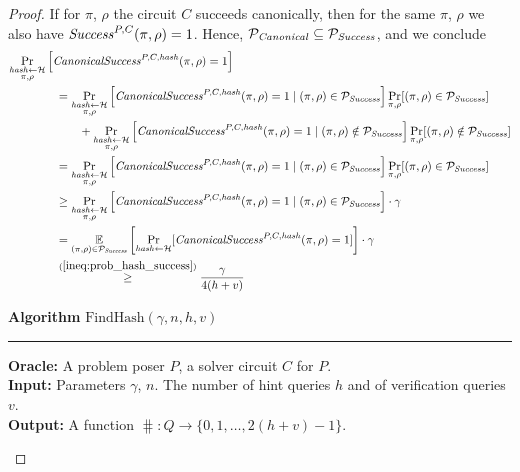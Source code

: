 \begin{proof}
If for $\pi$, $\rho$ the circuit $C$ succeeds canonically, then for the same $\pi$, $\rho$ we also have $\operatorname{\mathit{Success}}^{P, C}(\pi, \rho) = 1$.
Hence, $\mathcal{P}_{\mathit{Canonical}} \subseteq \mathcal{P}_{\mathit{Success}}$, and we conclude
\begin{align}
  \label{ineq:hash_high_prob}
&\underset{\substack{\hash \leftarrow \cH \\ \pi, \rho}}{\Pr}\left[\CanonicalSuccess^{P, C, \hash}(\pi, \rho) = 1\right] \notag\\
&\IndII = \underset{\substack{\hash \leftarrow \cH \\ \pi, \rho}}{\Pr}\left[\CanonicalSuccess^{P,C,\hash}(\pi, \rho) = 1 \mid (\pi, \rho) \in \cP_{\mathit{Success}}\right]
\underset{\pi, \rho}{\Pr}[(\pi, \rho) \in \cP_{\mathit{Success}}] \notag\\
&\IndIII + \underset{\substack{\hash \leftarrow \cH \\ \pi, \rho}}{\Pr}\left[\CanonicalSuccess^{P,C,\hash}(\pi, \rho) = 1 \mid (\pi, \rho) \notin \cP_{\mathit{Success}} \right]
\underset{\pi, \rho}{\Pr}[(\pi, \rho) \notin \cP_{\mathit{Success}}] \notag\\
%
&\IndII = \underset{\substack{\hash \leftarrow \cH \\ \pi, \rho}}{\Pr}\left[\CanonicalSuccess^{P,C,\hash}(\pi, \rho) = 1 \mid (\pi, \rho) \in \cP_{\mathit{Success}}\right]
\underset{\pi, \rho}{\Pr}[(\pi, \rho) \in \cP_{\mathit{Success}}] \notag\\
%
&\IndII \geq
\underset{\substack{\hash \leftarrow \cH \\ \pi, \rho}}{\Pr}\left[\CanonicalSuccess^{P,C,\hash}(\pi, \rho) = 1 \mid (\pi, \rho) \in \cP_{\mathit{Success}}\right] \cdot \gamma \notag\\
&\IndII =
\underset{(\pi, \rho) \in \cP_{\mathit{Success}}}
{\mathbb{E}}\left[\underset{\hash \leftarrow \cH}{\Pr}[\CanonicalSuccess^{P,C,\hash}(\pi, \rho) = 1] \right] \cdot \gamma \notag\\
&\IndII \stackrel{(\ref{ineq:prob_hash_success})}{\geq} \frac{\gamma}{4(h+v)}
\end{align}
%
\begin{codeblock}
  \textbf{Algorithm} $\text{FindHash}(\gamma, n, h, v)$
  \medskip
  \hrule
  \medskip
  \textbf{Oracle:} A problem poser $P$, a solver circuit $C$ for $P$.\\
  \textbf{Input:} Parameters $\gamma$, $n$. The number of hint queries $h$ and of verification queries $v$. \\
  \textbf{Output:} A function $\hash:Q \rightarrow \{0,1, \dots, 2(h+v)-1 \}$.

\end{codeblock}
\end{proof}
